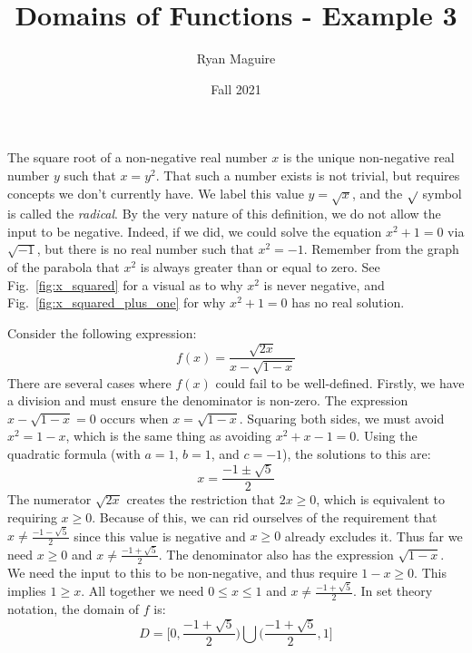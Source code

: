 \documentclass{article}
\title{Domains of Functions - Example 3}
\author{Ryan Maguire}
\date{Fall 2021}
\begin{document}
    \maketitle
    The square root of a non-negative real number $x$ is the unique
    non-negative real number $y$ such that $x=y^{2}$. That such a number exists
    is not trivial, but requires concepts we don't currently have. We
    label this value $y=\sqrt{x}$, and the $\sqrt{\empty}$ symbol is called the
    \textit{radical}. By the very nature of this definition, we do not allow
    the input to be negative. Indeed, if we did, we could solve the equation
    $x^{2}+1=0$ via $\sqrt{-1}$, but there is no real number such that
    $x^{2}=-1$. Remember from the graph of the parabola that $x^{2}$ is
    always greater than or equal to zero. See
    Fig.~\ref{fig:x_squared} for a visual as to why $x^{2}$ is never negative,
    and Fig.~\ref{fig:x_squared_plus_one} for why $x^{2}+1=0$ has no real
    solution.
    \par\hfill\par
    Consider the following expression:
    \begin{equation}
        f(x)=\frac{\sqrt{2x}}{x-\sqrt{1-x}}
    \end{equation}
    There are several cases where $f(x)$ could fail to be well-defined. Firstly,
    we have a division and must ensure the denominator is non-zero. The
    expression $x-\sqrt{1-x}=0$ occurs when $x=\sqrt{1-x}$. Squaring both
    sides, we must avoid $x^{2}=1-x$, which is the same thing as avoiding
    $x^{2}+x-1=0$. Using the quadratic formula (with $a=1$, $b=1$, and
    $c=-1$), the solutions to this are:
    \begin{equation}
        x=\frac{-1\pm\sqrt{5}}{2}
    \end{equation}
    The numerator $\sqrt{2x}$ creates the restriction that $2x\geq{0}$, which
    is equivalent to requiring $x\geq{0}$. Because of this, we can rid ourselves
    of the requirement that $x\ne\frac{-1-\sqrt{5}}{2}$ since this value is
    negative and $x\geq{0}$ already excludes it. Thus far we need
    $x\geq{0}$ and $x\ne\frac{-1+\sqrt{5}}{2}$. The denominator also has the
    expression $\sqrt{1-x}$. We need the input to this to be non-negative, and
    thus require $1-x\geq{0}$. This implies $1\geq{x}$. All together we need
    $0\leq{x}\leq{1}$ and $x\ne\frac{-1+\sqrt{5}}{2}$. In set theory notation,
    the domain of $f$ is:
    \begin{equation}
        D=\Big[0,\frac{-1+\sqrt{5}}{2}\Big)\bigcup
        \Big(\frac{-1+\sqrt{5}}{2},1\Big]
    \end{equation}
\end{document}
